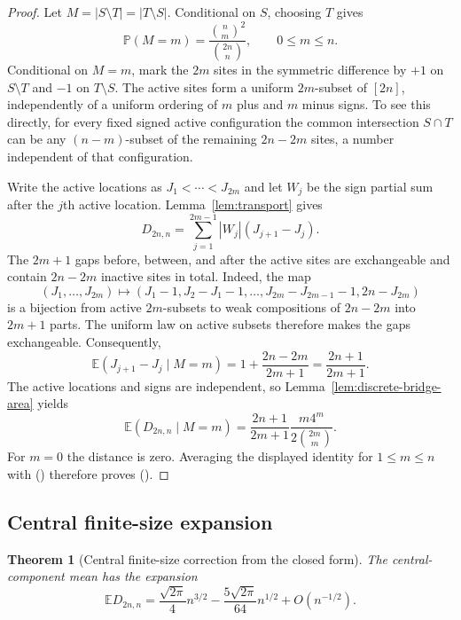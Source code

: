 \documentclass[twoside,10pt]{article}
\numberwithin{equation}{section}
\theoremstyle{slbody}
\newtheorem{theorem}{Theorem}[section]
\theoremstyle{definition}
\theoremstyle{remark}
\newcommand{\E}{\mathbb{E}}
\newcommand{\Pp}{\mathbb{P}}
\newcommand{\1}{\mathbf{1}}
\renewcommand{\eqref}[1]{%
  \textup{{\normalfont(\oldstylenums{\ref{#1}}}\normalfont)}}
\begin{document}
\begin{proof}
Let $M=|S\setminus T|=|T\setminus S|$.  Conditional on $S$, choosing $T$
gives
\begin{equation}\label{eq:M-law}
 \Pp(M=m)=\frac{\binom{n}{m}^2}{\binom{2n}{n}},
 \qquad 0\leq m\leq n.
\end{equation}
Conditional on $M=m$, mark the $2m$ sites in the symmetric difference by
$+1$ on $S\setminus T$ and $-1$ on $T\setminus S$.  The active sites form a
uniform $2m$-subset of $[2n]$, independently of a uniform ordering of $m$
plus and $m$ minus signs.  To see this directly, for every fixed signed active
configuration the common intersection $S\cap T$ can be any $(n-m)$-subset of
the remaining $2n-2m$ sites, a number independent of that configuration.

Write the active locations as $J_1<\cdots<J_{2m}$ and let $W_j$ be the sign
partial sum after the $j$th active location.  Lemma~\ref{lem:transport} gives
\begin{equation}\label{eq:stretched-area}
 D_{2n,n}=\sum_{j=1}^{2m-1}|W_j|(J_{j+1}-J_j).
\end{equation}
The $2m+1$ gaps before, between, and after the active sites are exchangeable
and contain $2n-2m$ inactive sites in total.  Indeed, the map
\[
 (J_1,\ldots,J_{2m})\longmapsto
 (J_1-1,J_2-J_1-1,\ldots,J_{2m}-J_{2m-1}-1,2n-J_{2m})
\]
is a bijection from active $2m$-subsets to weak compositions of $2n-2m$
into $2m+1$ parts.  The uniform law on active subsets therefore makes the
gaps exchangeable.  Consequently,
\[
 \E(J_{j+1}-J_j\mid M=m)=1+\frac{2n-2m}{2m+1}
 =\frac{2n+1}{2m+1}.
\]
The active locations and signs are independent, so
Lemma~\ref{lem:discrete-bridge-area} yields
\[
 \E(D_{2n,n}\mid M=m)
 =\frac{2n+1}{2m+1}\frac{m4^m}{2\binom{2m}{m}}.
\]
For $m=0$ the distance is zero.  Averaging the displayed identity for
$1\leq m\leq n$ with \eqref{eq:M-law} therefore proves
\eqref{eq:central-exact}.
\end{proof}

\subsection{Central finite-size expansion}

\begin{theorem}[Central finite-size correction from the closed form]\label{thm:finite-size}
The central-component mean has the expansion
\begin{equation}\label{eq:finite-size}
 \E D_{2n,n}
 =\frac{\sqrt{2\pi}}4n^{3/2}
 -\frac{5\sqrt{2\pi}}{64}n^{1/2}
 +O(n^{-1/2}).
\end{equation}
\end{theorem}
\end{document}
